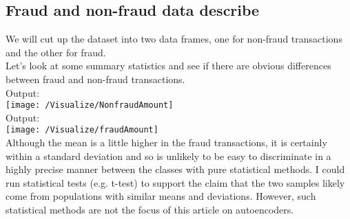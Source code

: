 \documentclass[17pt]{report}
\begin{document}
\subsection{Fraud and non-fraud data describe}
We will cut up the dataset into two data frames, one for non-fraud transactions and the other for fraud.\\

Let's look at some summary statistics and see if there are obvious differences between fraud and non-fraud
transactions.\\

Output:\\
\texttt{[image: /Visualize/NonfraudAmount]}\\

Output:\\
\texttt{[image: /Visualize/fraudAmount]}\\
Although the mean is a little higher in the fraud transactions, it is certainly within a standard deviation and so is
unlikely to be easy to discriminate in a highly precise manner between the classes with pure statistical methods.
I could run statistical tests (e.g. t-test) to support the claim that the two samples likely come from populations
with similar means and deviations. However, such statistical methods are not the focus of this article on
autoencoders.
\end{document}
